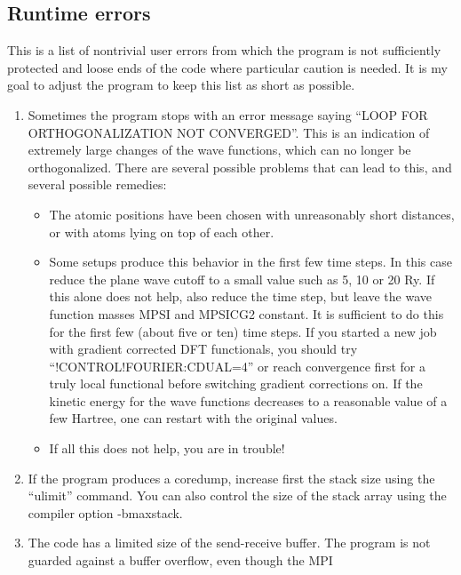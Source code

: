 \documentclass[final,12pt,makeidx,DIV=calc]{article}
\begin{document}
{{{\begin{itemize}
\end{itemize}



\subsection{Runtime errors}

This is a list of nontrivial user errors from which the program is not
sufficiently protected and loose ends of the code where particular
caution is needed. It is my goal to adjust the program to
keep this list as short as possible.

\begin{enumerate}
\item Sometimes the program stops with an error message saying 
  ``LOOP FOR ORTHOGONALIZATION NOT CONVERGED''. This is an indication
  of extremely large changes of the wave functions, which can no
  longer be orthogonalized. There are several possible problems that can
  lead to this, and several possible remedies: 
  \begin{itemize}
  \item The atomic positions have been chosen with unreasonably short
    distances, or with atoms lying on top of each other.
  \item Some setups produce this behavior in the first few time steps.
    In this case reduce the plane wave cutoff to a small value such as
    5, 10 or 20 Ry. If this alone does not help, also reduce the time
    step, but leave the wave function masses MPSI and MPSICG2
    constant. It is sufficient to do this for the first few (about five
    or ten) time steps. If you started a new job with gradient
    corrected DFT functionals, you should try
    ``!CONTROL!FOURIER:CDUAL=4'' or reach convergence first for a
    truly local functional before switching gradient corrections
    on. If the kinetic energy for the wave functions decreases to a
    reasonable value of a few Hartree, one can restart with the
    original values.
  \item If all this does not help, you are in trouble!
  \end{itemize}
\item If the program produces a coredump, increase first the stack size
  using the ``ulimit'' command. You can also control the size of the stack
  array using the compiler option -bmaxstack.
\item The code has a limited size of the send-receive buffer. The
  program is not guarded against a buffer overflow, even though the MPI

\end{enumerate}}}}
\end{document}
